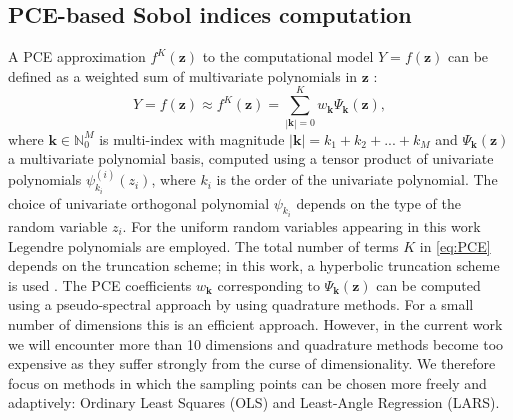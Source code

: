 \subsection{PCE-based Sobol indices computation}
A PCE approximation $f^{K}(\mathbf{z})$ to the computational model $Y=f(\mathbf{z})$ can be defined as a weighted sum of multivariate polynomials in $\mathbf{z}$ \cite{RSmith}:
\begin{equation}\label{eq:PCE}
Y= f(\mathbf{z}) \approx f^{K}(\mathbf{z}) = \sum_{|\mathbf{k}| = 0}^K w_{\mathbf{k}}\Psi_{\mathbf{k}}(\mathbf{z}),
\end{equation}
where $\mathbf{k}\in \mathbb{N}_0^M$ is multi-index with magnitude $|\mathbf{k}| = k_1+k_2 + ... + k_M$ and $\Psi_{\mathbf{k}}(\mathbf{z})$ a multivariate polynomial basis, computed using a tensor product of univariate polynomials $\psi_{k_i}^{(i)}(z_i)$, 
where $k_i$ is the order of the univariate polynomial. The choice of univariate orthogonal polynomial $\psi_{k_i}$ depends on the type of the random variable $z_i$. For the uniform random variables appearing in this work Legendre polynomials are employed. 
The total number of terms $K$ in \eqref{eq:PCE} depends on the truncation scheme; in this work, a hyperbolic truncation scheme is used \cite{BlatmanThesis}. The PCE coefficients $w_{\mathbf{k}}$ corresponding to $\Psi_{\mathbf{k}}(\mathbf{z})$ can be computed using a pseudo-spectral approach by using quadrature methods. For a small number of dimensions this is an efficient approach. However, in the current work we will encounter more than 10 dimensions and quadrature methods become too expensive as they suffer strongly from the curse of dimensionality. We therefore focus on methods in which the sampling points can be chosen more freely and adaptively: Ordinary Least Squares (OLS) and Least-Angle Regression (LARS).

